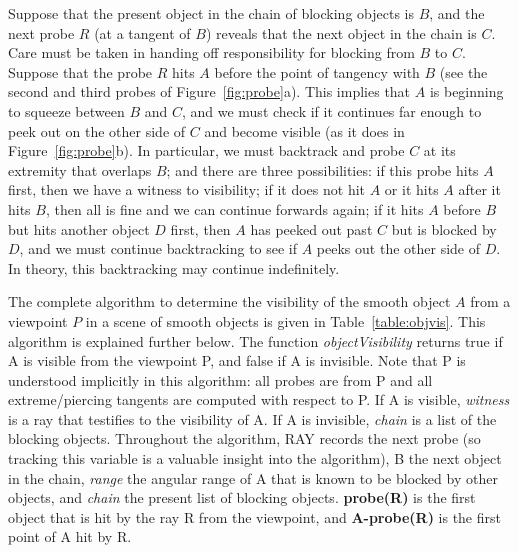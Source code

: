 \documentclass[10pt,twocolumn]{article}
\begin{document}
Suppose that the present object in the chain of blocking objects is $B$,
and the next probe $R$ (at a tangent of $B$)
reveals that the next object in the chain is $C$.
Care must be taken in handing off responsibility for blocking from $B$ to $C$.
Suppose that the probe $R$ hits $A$ before the point of tangency with $B$ 
(see the second and third probes of Figure~\ref{fig:probe}a).
This implies that $A$ is beginning to squeeze between $B$ and $C$,
and we must check if it continues far enough to peek out on the other side of $C$
and become visible (as it does in Figure~\ref{fig:probe}b).
In particular, we must backtrack and probe $C$ at its extremity that overlaps $B$;
and there are three possibilities:
if this probe hits $A$ first, then we have a witness to visibility;
if it does not hit $A$ or it hits $A$ after it hits $B$, 
then all is fine and we can continue forwards again;
if it hits $A$ before $B$ but hits another object $D$ first,
then $A$ has peeked out past $C$ but is blocked by $D$, 
and we must continue backtracking to see if $A$ peeks out the other side of $D$.
In theory, this backtracking may continue indefinitely.

The complete algorithm to determine the visibility of the smooth object $A$
from a viewpoint $P$ in a scene of smooth objects is given in Table~\ref{table:objvis}.
This algorithm is explained further below.
The function {\em objectVisibility} returns true if A is visible from the viewpoint P, 
and false if A is invisible.
Note that P is understood implicitly in this algorithm: all probes are from P and all
extreme/piercing tangents are computed with respect to P.
If A is visible, {\em witness} is a ray that testifies to the visibility of A.
If A is invisible, {\em chain}  is a list of the blocking objects.
Throughout the algorithm, 
RAY records the next probe (so tracking this variable is a valuable insight 
into the algorithm), 
B the next object in the chain, {\em range} the
angular range of A that is known to be blocked by other objects, and {\em chain} 
the present list of blocking objects.
%
{\bf probe(R)} is the first object that is hit by the ray R from the viewpoint,
and {\bf A-probe(R)} is the first point of A hit by R.
\end{document}
